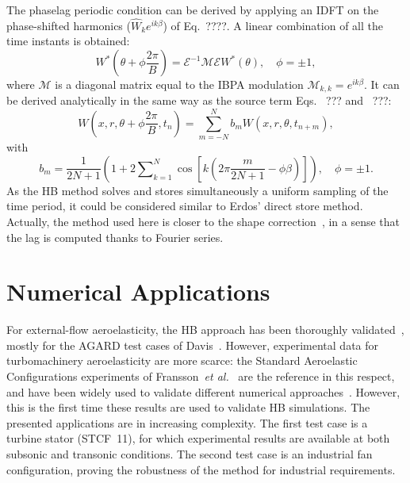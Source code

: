 The phaselag periodic condition can be derived by applying an
  IDFT on the phase-shifted harmonics ($\widehat{W}_ke^{ik\beta}$) of
  Eq.~????. A linear
combination of all the time instants is obtained:
\begin{equation}
  W^*\left(\theta+\phi\frac{2\pi}{B}\right)=\mathcal{E}^{-1}\mathcal{M}\mathcal{E}W^*(\theta),\quad \phi=\pm 1,
\end{equation}
where $\mathcal{M}$ is a diagonal matrix equal to the IBPA modulation
$\mathcal{M}_{k,k}=e^{i k\beta}$. It can be derived
analytically in the same way as the source term Eqs.~ ???
and~ ???:
\begin{equation}
  W\left(x, r, \theta+\phi\frac{2\pi}{B}, t_n\right) =\sum_{m=-N}^N
  b_mW(x, r, \theta, t_{n+m}), 
\end{equation}
with
\begin{equation}
  b_m=\frac{1}{2N+1}\left(1+2\sum\nolimits_{k=1}^N\cos\left[k\left(2\pi
        \frac{m}{2N+1}-\phi \beta\right)\right]\right),\quad \phi=\pm 1.
\end{equation}
As the HB method solves and stores simultaneously a uniform sampling
of the time period, it could be considered similar to Erdos' direct
store method. Actually, the method used here is closer to the shape
correction~\cite{He1990}, in a sense that the lag is
computed thanks to Fourier series.%

\section{Numerical Applications}
For external-flow aeroelasticity, the HB approach has been thoroughly validated~\cite{Gopinath2005,Sicot2008,Woodgate2009,Dufour2010}, mostly for the AGARD test cases of Davis~\cite{Davis1982}. However, experimental data for turbomachinery aeroelasticity are more scarce: the Standard Aeroelastic Configurations experiments of Fransson~\textit{et al.}~\cite{Fransson:1999uq} are the reference in this respect, and have been widely used to validate different numerical approaches~\cite{Sbardella:2001fk,Duta:2002uq,Campobasso:2003fk,Cinnella2004,mcbean2005}. However, this is the first time these results are used to validate HB simulations. %
The presented applications are in increasing complexity.  The first
test case is a turbine stator (STCF~11), for which experimental results are available at both subsonic and transonic conditions.  %
The second test case is an industrial fan configuration, proving the
robustness of the method for industrial requirements.


